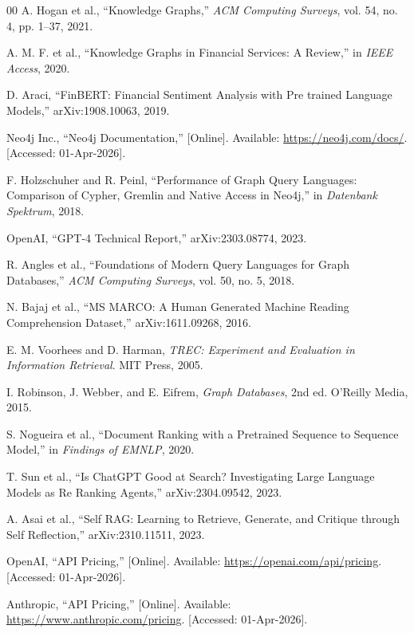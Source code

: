 \documentclass[conference]{IEEEtran}
\begin{document}
\begin{thebibliography}{00}
A. Hogan et al., ``Knowledge Graphs,'' \textit{ACM Computing Surveys}, vol. 54, no. 4, pp. 1--37, 2021.

A. M. F. et al., ``Knowledge Graphs in Financial Services: A Review,'' in \textit{IEEE Access}, 2020.

D. Araci, ``FinBERT: Financial Sentiment Analysis with Pre trained Language Models,'' arXiv:1908.10063, 2019.

Neo4j Inc., ``Neo4j Documentation,'' [Online]. Available: \url{https://neo4j.com/docs/}. [Accessed: 01-Apr-2026].

F. Holzschuher and R. Peinl, ``Performance of Graph Query Languages: Comparison of Cypher, Gremlin and Native Access in Neo4j,'' in \textit{Datenbank Spektrum}, 2018.

OpenAI, ``GPT-4 Technical Report,'' arXiv:2303.08774, 2023.

R. Angles et al., ``Foundations of Modern Query Languages for Graph Databases,'' \textit{ACM Computing Surveys}, vol. 50, no. 5, 2018.

N. Bajaj et al., ``MS MARCO: A Human Generated Machine Reading Comprehension Dataset,'' arXiv:1611.09268, 2016.

E. M. Voorhees and D. Harman, \textit{TREC: Experiment and Evaluation in Information Retrieval}. MIT Press, 2005.

I. Robinson, J. Webber, and E. Eifrem, \textit{Graph Databases}, 2nd ed. O'Reilly Media, 2015.

S. Nogueira et al., ``Document Ranking with a Pretrained Sequence to Sequence Model,'' in \textit{Findings of EMNLP}, 2020.

T. Sun et al., ``Is ChatGPT Good at Search? Investigating Large Language Models as Re Ranking Agents,'' arXiv:2304.09542, 2023.

A. Asai et al., ``Self RAG: Learning to Retrieve, Generate, and Critique through Self Reflection,'' arXiv:2310.11511, 2023.

OpenAI, ``API Pricing,'' [Online]. Available: \url{https://openai.com/api/pricing}. [Accessed: 01-Apr-2026].

Anthropic, ``API Pricing,'' [Online]. Available: \url{https://www.anthropic.com/pricing}. [Accessed: 01-Apr-2026].


\end{thebibliography}
\end{document}
